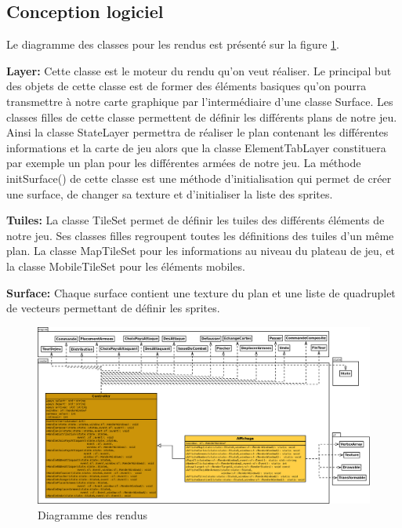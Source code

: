 \subsection{Conception logiciel}

Le diagramme des classes pour les rendus est présenté sur la figure \ref{fig:render}.

\textbf{Layer:} Cette classe est le moteur du rendu qu’on veut réaliser. Le principal but des objets de cette classe est de former des éléments basiques qu’on pourra transmettre à notre carte graphique par l’intermédiaire d’une classe Surface. Les classes filles de cette classe permettent de définir les différents plans de notre jeu. Ainsi la classe StateLayer permettra de réaliser le plan contenant les différentes informations et la carte de jeu alors que la classe ElementTabLayer constituera par exemple un plan pour les différentes armées de notre jeu.
La méthode initSurface() de cette classe est une méthode d'initialisation qui permet de créer une surface, de changer sa texture et d’initialiser la liste des sprites. 

\textbf{Tuiles:} La classe TileSet permet de définir les tuiles des différents éléments de notre jeu. Ses classes filles regroupent toutes les définitions des tuiles d’un même plan. La classe MapTileSet pour les informations au niveau du plateau de jeu, et la classe MobileTileSet pour les éléments mobiles.

\textbf{Surface:} Chaque surface contient une texture du plan et une liste de quadruplet de
vecteurs permettant de définir les sprites.




\begin{landscape}
    \begin{figure}[!htbp]
        \centering
        \includegraphics[width=21cm]{Images/render.png}
        \caption{Diagramme des rendus}
        \label{fig:render}
    \end{figure}
\end{landscape}